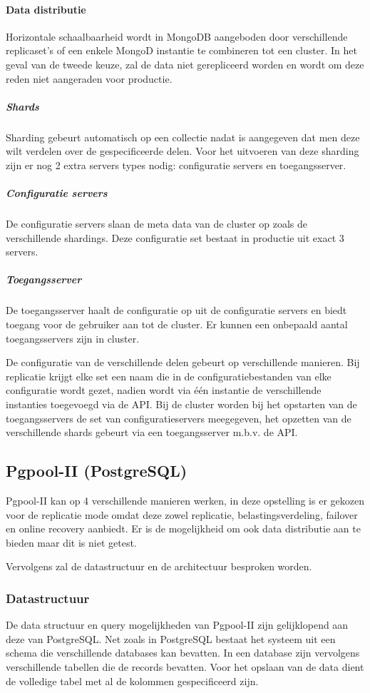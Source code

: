 \paragraph{Data distributie\cite{mongodb-shard}} Horizontale schaalbaarheid wordt in MongoDB aangeboden door verschillende replicaset's of een enkele MongoD instantie te combineren tot een cluster. In het geval van de tweede keuze, zal de data niet gerepliceerd worden en wordt om deze reden niet aangeraden voor productie. 
\subparagraph{Shards} Sharding gebeurt automatisch op een collectie nadat is aangegeven dat men deze wilt verdelen over de gespecificeerde delen. Voor het uitvoeren van deze sharding zijn er nog 2 extra servers types nodig: configuratie servers en toegangsserver. 
\subparagraph{Configuratie servers} De configuratie servers slaan de meta data van de cluster op zoals de verschillende shardings. Deze configuratie set bestaat in productie uit exact 3 servers.
\subparagraph{Toegangsserver} De toegangsserver haalt de configuratie op uit de configuratie servers en biedt toegang voor de gebruiker aan tot de cluster. Er kunnen een onbepaald aantal toegangsservers zijn in cluster. 

De configuratie van de verschillende delen gebeurt op verschillende manieren. Bij replicatie krijgt elke set een naam die in de configuratiebestanden van elke configuratie wordt gezet, nadien wordt via één instantie de verschillende instanties toegevoegd via de API. Bij de cluster worden bij het opstarten van de toegangsservers de set van configuratieservers meegegeven, het opzetten van de verschillende shards gebeurt via een toegangsserver m.b.v. de API. 

\subsection{Pgpool-II (PostgreSQL)\cite{pgpool-doc}}
Pgpool-II kan op 4 verschillende manieren werken, in deze opstelling is er gekozen voor de replicatie mode omdat deze zowel replicatie, belastingsverdeling, failover en online recovery aanbiedt. Er is de mogelijkheid om ook data distributie aan te bieden maar dit is niet getest. 

Vervolgens zal de datastructuur en de architectuur besproken worden.  
\subsubsection{Datastructuur}
De data structuur en query mogelijkheden van Pgpool-II zijn gelijklopend aan deze van PostgreSQL. Net zoals in PostgreSQL bestaat het systeem uit een schema die verschillende databases kan bevatten. In een database zijn vervolgens verschillende tabellen die de records bevatten. Voor het opslaan van de data dient de volledige tabel met al de kolommen gespecificeerd zijn. 

